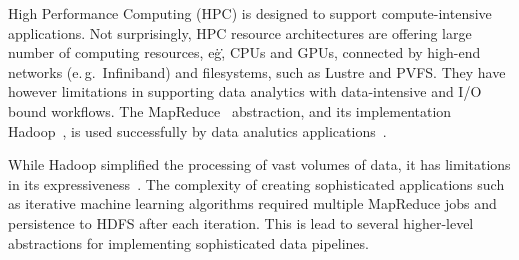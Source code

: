 \label{sec:pilot-data-hadoop}
High Performance Computing (HPC) is designed to support compute-intensive applications.
Not surprisingly, HPC resource architectures are offering large number of computing resources, e\.g\., CPUs and GPUs, connected by high-end networks (e.\,g.\ Infiniband) and filesystems, such as Lustre and PVFS.
They have however limitations in supporting data analytics with data-intensive and I/O bound workflows.
The MapReduce~\cite{dean2004mapreduce} abstraction, and its implementation Hadoop~\cite{hadoop}, is used successfully by data analutics applications~\cite{hellerstein2012science}.


While Hadoop simplified the processing of vast volumes of data, it has limitations in its expressiveness~\cite{yelick2011magellan,isard2007dryad}.
The complexity of creating sophisticated applications such as iterative machine learning algorithms required multiple MapReduce jobs and persistence to HDFS after each iteration.
This is lead to several higher-level abstractions for implementing sophisticated data pipelines.

